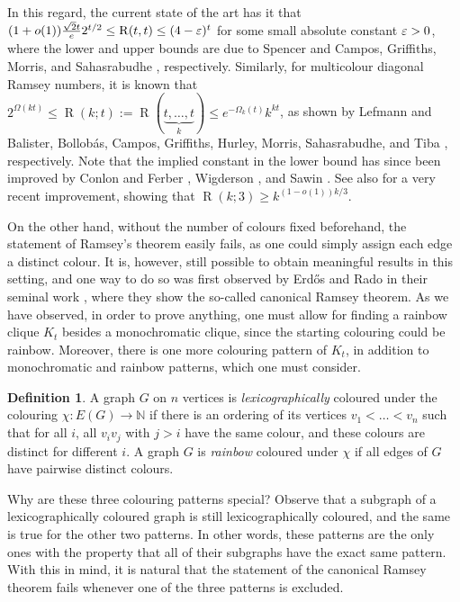 \documentclass[11pt]{article}
\theoremstyle{plain}
\theoremstyle{definition}
\newtheorem{definition}{Definition}
\newcommand{\N}{\mathbb{N}}
\renewcommand{\epsilon}{\ensuremath\varepsilon}
\begin{document}
In this regard, the current state of the art has it that $(1+o(1))\frac{\sqrt{2}t}{e}2^{t/2}\leq \operatorname{R}(t,t)\le (4-\epsilon)^t$ for some small absolute constant $\epsilon>0$, where the lower and upper bounds are due to Spencer \cite{spencer1977asymptotic} and Campos, Griffiths, Morris, and Sahasrabudhe \cite{campos2026exponential}, respectively. Similarly, for multicolour diagonal Ramsey numbers, it is known that $2^{\Omega(kt)}\le \operatorname{R}(k;t):=\operatorname{R}(\underbrace{t,\dots,t}_k)\le e^{-\Omega_k(t)}k^{kt}$, as shown by Lefmann \cite{lefmann1987note} and Balister, Bollob\'as, Campos, Griffiths, Hurley, Morris, Sahasrabudhe, and Tiba \cite{balister2026upper}, respectively. Note that the implied constant in the lower bound has since been improved by Conlon and Ferber \cite{conlon2021lower}, Wigderson \cite{wigderson2021improved}, and Sawin \cite{sawin2022improved}. See also \cite{OpenAI} for a very recent improvement, showing that $\operatorname{R}(k; 3)\geq k^{(1-o(1))k/3}$.

On the other hand, without the number of colours fixed beforehand, the statement of Ramsey's theorem easily fails, as one could simply assign each edge a distinct colour. It is, however, still possible to obtain meaningful results in this setting, and one way to do so was first observed by Erd\H{o}s and Rado in their seminal work \cite{erdos1950combinatorial}, where they show the so-called canonical Ramsey theorem. As we have observed, in order to prove anything, one must allow for finding a rainbow clique $K_t$ besides a monochromatic clique, since the starting colouring could be rainbow. Moreover, there is one more colouring pattern of $K_t$, in addition to monochromatic and rainbow patterns, which one must consider.

\begin{definition}\label{def-erado}
    A graph $G$ on $n$ vertices is \emph{lexicographically} coloured under the colouring $\chi:E(G)\to\N$ if there is an ordering of its vertices $v_1<\dots<v_n$ such that for all $i$, all $v_i v_j$ with $j>i$ have the same colour, and these colours are distinct for different $i$. A graph $G$ is \emph{rainbow} coloured under $\chi$ if all edges of $G$ have pairwise distinct colours.
\end{definition}

Why are these three colouring patterns special? Observe that a subgraph of a lexicographically coloured graph is still lexicographically coloured, and the same is true for the other two patterns. In other words, these patterns are the only ones with the property that all of their subgraphs have the exact same pattern. With this in mind, it is natural that the statement of the canonical Ramsey theorem fails whenever one of the three patterns is excluded.
\end{document}
